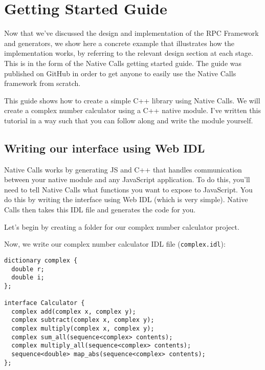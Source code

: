 \section{Getting Started Guide} %
\label{sec:end_to_end_example}
Now that we've discussed the design and implementation of the RPC Framework and generators, we show here a concrete example that illustrates how the implementation works, by referring to the relevant design section at each stage. This is in the form of the Native Calls getting started guide. The guide was published on GitHub in order to get anyone to easily use the Native Calls framework from scratch.

This guide shows how to create a simple C++ library using Native Calls.
We will create a complex number calculator using a C++ native module.
I've written this tutorial in a way such that you can follow along and
write the module yourself.

\subsection{Writing our interface using Web
IDL}\label{writing-our-interface-using-web-idl}

Native Calls works by generating JS and C++ that handles communication
between your native module and any JavaScript application. To do this,
you'll need to tell Native Calls what functions you want to expose to
JavaScript. You do this by writing the interface using Web IDL (which is
very simple). Native Calls then takes this IDL file and generates the
code for you.

Let's begin by creating a folder for our complex number calculator
project.

\begin{Shaded}
\begin{Highlighting}[]
 
 
 
\end{Highlighting}
\end{Shaded}

Now, we write our complex number calculator IDL file
(\texttt{complex.idl}):

\begin{verbatim}
dictionary complex {
  double r;
  double i;
};

interface Calculator {
  complex add(complex x, complex y);
  complex subtract(complex x, complex y);
  complex multiply(complex x, complex y);
  complex sum_all(sequence<complex> contents);
  complex multiply_all(sequence<complex> contents);
  sequence<double> map_abs(sequence<complex> contents);
};
\end{verbatim}

